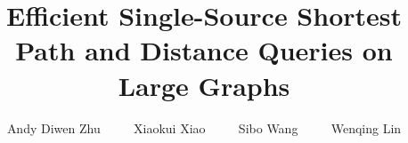 \documentclass{sig-alternate}
\begin{document}
\begin{sloppy}

\title{Efficient Single-Source Shortest Path and Distance Queries on Large Graphs}


\author{
\alignauthor
Andy Diwen Zhu $\qquad$ Xiaokui Xiao $\qquad$ Sibo Wang $\qquad$ Wenqing Lin \\
\\
}

\maketitle
\begin{abstract}
%



\end{abstract}
\end{sloppy}
\end{document}
